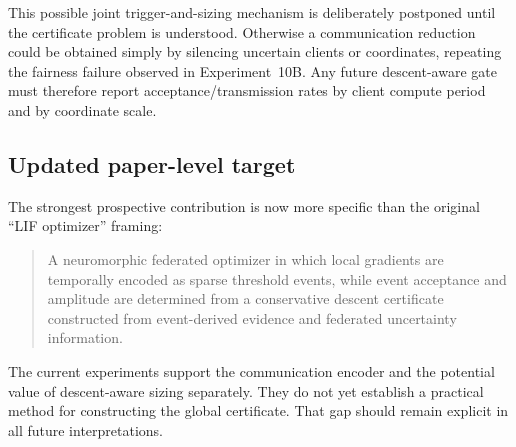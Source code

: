 This possible joint trigger-and-sizing mechanism is deliberately postponed until the certificate problem is understood. Otherwise a communication reduction could be obtained simply by silencing uncertain clients or coordinates, repeating the fairness failure observed in Experiment~10B. Any future descent-aware gate must therefore report acceptance/transmission rates by client compute period and by coordinate scale.

\subsection{Updated paper-level target}

The strongest prospective contribution is now more specific than the original ``LIF optimizer'' framing:
\begin{quote}
A neuromorphic federated optimizer in which local gradients are temporally encoded as sparse threshold events, while event acceptance and amplitude are determined from a conservative descent certificate constructed from event-derived evidence and federated uncertainty information.
\end{quote}
The current experiments support the communication encoder and the potential value of descent-aware sizing separately. They do not yet establish a practical method for constructing the global certificate. That gap should remain explicit in all future interpretations.
